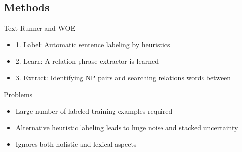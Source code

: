 \documentclass[11pt]{beamer}
\begin{document}
	\subsection{Methods}
		\begin{frame}{Text Runner and WOE}
			\begin{center}
				\begin{itemize}
				\item 1. Label: Automatic sentence labeling by heuristics
				\item 2. Learn: A relation phrase extractor is learned
				\item 3. Extract: Identifying NP pairs and searching relations words between
				\end{itemize}
			\end{center}
		\end{frame}
		\begin{frame}{Problems}
					\begin{center}
						\begin{itemize}
						\item Large number of labeled training examples required
						\item Alternative heuristic labeling leads to huge noise and stacked uncertainty
						\item Ignores both holistic and lexical aspects 
						\end{itemize}
					\end{center}
				\end{frame}
		
\end{document}
